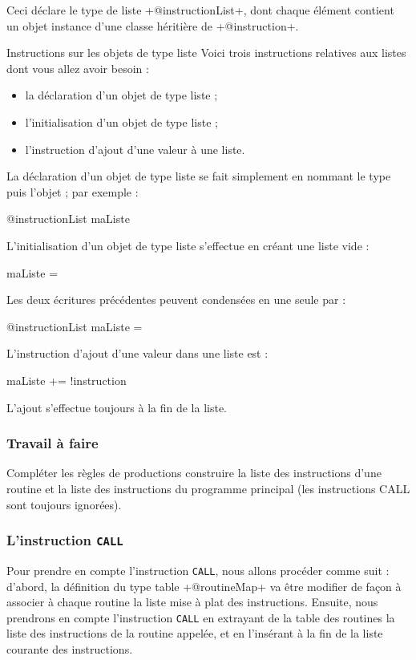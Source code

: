 Ceci déclare le type de liste \ggs+@instructionList+, dont chaque élément contient un objet instance d'une classe héritière de \ggs+@instruction+.

Instructions sur les objets de type liste
Voici trois instructions relatives aux listes dont vous allez avoir besoin :
\begin{itemize}
  \item la déclaration d'un objet de type liste ;
  \item l'initialisation d'un objet de type liste ;
  \item l'instruction d'ajout d'une valeur à une liste.
\end{itemize}

La déclaration d'un objet de type liste se fait simplement en nommant le type puis l'objet ; par exemple :
\begin{galgas}
@instructionList maListe
\end{galgas}

L'initialisation d'un objet de type liste s'effectue en créant une liste vide :
\begin{galgas}
maListe = {}
\end{galgas}

Les deux écritures précédentes peuvent condensées en une seule par :
\begin{galgas}
@instructionList maListe = {}
\end{galgas}

L'instruction d'ajout d'une valeur dans une liste est :
\begin{galgas}
maListe += !instruction
\end{galgas}
L'ajout s'effectue toujours à la fin de la liste.

\subsubsection{Travail à faire}
Compléter les règles de productions construire la liste des instructions d'une routine et la liste des instructions du programme principal (les instructions CALL sont toujours ignorées).

\subsubsection{L'instruction \texttt{CALL}}
Pour prendre en compte l’instruction \texttt{CALL}, nous allons procéder comme suit : d’abord, la définition du type table \ggs+@routineMap+ va être modifier de façon à associer à chaque routine la liste mise à plat des instructions. Ensuite, nous prendrons en compte l’instruction \texttt{CALL} en extrayant de la table des routines la liste des instructions de la routine appelée, et en l’insérant à la fin de la liste courante des instructions.

